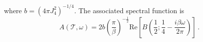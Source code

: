 \documentclass[prx,aps,onecolumn,amsfonts,showpacs,superscriptaddress,preprint,eqsecnum]
{revtex4-1}
\begin{document}
where $b=({4\pi J^{2}_{4}})^{-{1}/{4}}$. The associated spectral function is
\begin{equation}
A(\mathcal{T},\omega)=2b \left(\frac{\pi}{\beta}\right)^{-\frac{1}{2}} \text{Re}\left[B\left( \frac{1}{2}; \frac{1}{4} -\frac{i \beta\omega}{2 \pi}\right)\right] \,.
\end{equation}


\end{document}
